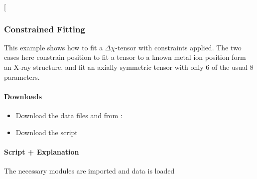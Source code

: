 \documentclass[a4paper,10pt,english,openany,oneside]{sphinxmanual}
\begin{document}
 {[}\sphinxcode{\sphinxupquote{pcs\_fit\_models.png}}{]}

\noindent{}


\subsubsection{Constrained Fitting}
\label{\detokenize{examples/pcs_fit_constrained:constrained-fitting}}\label{\detokenize{examples/pcs_fit_constrained:pcs-fit-constrained}}\label{\detokenize{examples/pcs_fit_constrained::doc}}
This example shows how to fit a \({\Delta\chi}\)-tensor with constraints applied. The two cases here constrain position to fit a tensor to a known metal ion position form an X-ray structure, and fit an axially symmetric tensor with only 6 of the usual 8 parameters.


\paragraph{Downloads}
\label{\detokenize{examples/pcs_fit_constrained:downloads}}\begin{itemize}
\item {} 
Download the data files  and  from :

\item {} 
Download the script 

\end{itemize}


\paragraph{Script + Explanation}
\label{\detokenize{examples/pcs_fit_constrained:script-explanation}}
The necessary modules are imported and data is loaded

%
\begin{sphinxVerbatim}[commandchars=\\\{\}]
      

  
  
  
  
\end{sphinxVerbatim}
\end{document}
